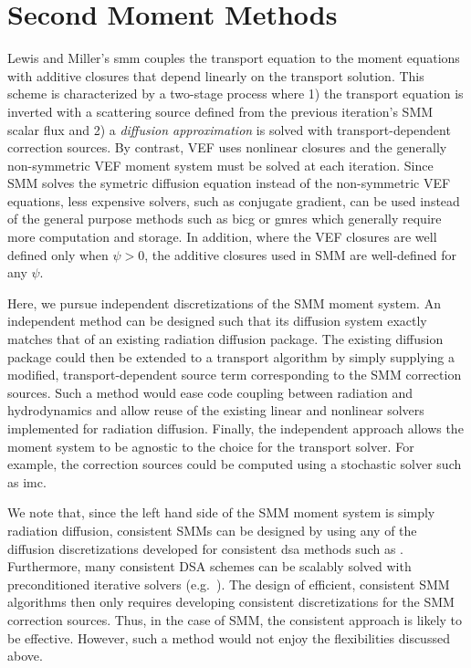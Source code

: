 \documentclass[../doc.tex]{subfiles}
\begin{document}
\chapter{Second Moment Methods} \label{chap:smm}
Lewis and Miller's \gls{smm} \cite{lewis_miller} couples the transport equation to the moment equations with additive closures that depend linearly on the transport solution. This scheme is characterized by a two-stage process where 1) the transport equation is inverted with a scattering source defined from the previous iteration's SMM scalar flux and 2) a \emph{diffusion approximation} is solved with transport-dependent correction sources. By contrast, VEF uses nonlinear closures and the generally non-symmetric VEF moment system must be solved at each iteration. Since SMM solves the symetric diffusion equation instead of the non-symmetric VEF equations, less expensive solvers, such as conjugate gradient, can be used instead of the general purpose methods such as \gls{bicg} or \gls{gmres} which generally require more computation and storage. 
In addition, where the VEF closures are well defined only when $\psi>0$, the additive closures used in SMM are well-defined for any $\psi$. 

Here, we pursue independent discretizations of the SMM moment system. 
An independent method can be designed such that its diffusion system exactly matches that of an existing radiation diffusion package. The existing diffusion package could then be extended to a transport algorithm by simply supplying a modified, transport-dependent source term corresponding to the SMM correction sources. Such a method would ease code coupling between radiation and hydrodynamics and allow reuse of the existing linear and nonlinear solvers implemented for radiation diffusion. Finally, the independent approach allows the moment system to be agnostic to the choice for the transport solver. For example, the correction sources could be computed using a stochastic solver such as \gls{imc}. 

We note that, since the left hand side of the SMM moment system is simply radiation diffusion, consistent SMMs can be designed by using any of the diffusion discretizations developed for consistent \gls{dsa} methods such as \textcite{WWM,AM,WR,ldrd_dsa}. Furthermore, many consistent DSA schemes can be scalably solved with preconditioned iterative solvers (e.g.~\cite{ldrd_dsa,WR}). The design of efficient, consistent SMM algorithms then only requires developing consistent discretizations for the SMM correction sources. Thus, in the case of SMM, the consistent approach is likely to be effective. However, such a method would not enjoy the flexibilities discussed above. 
\end{document}

